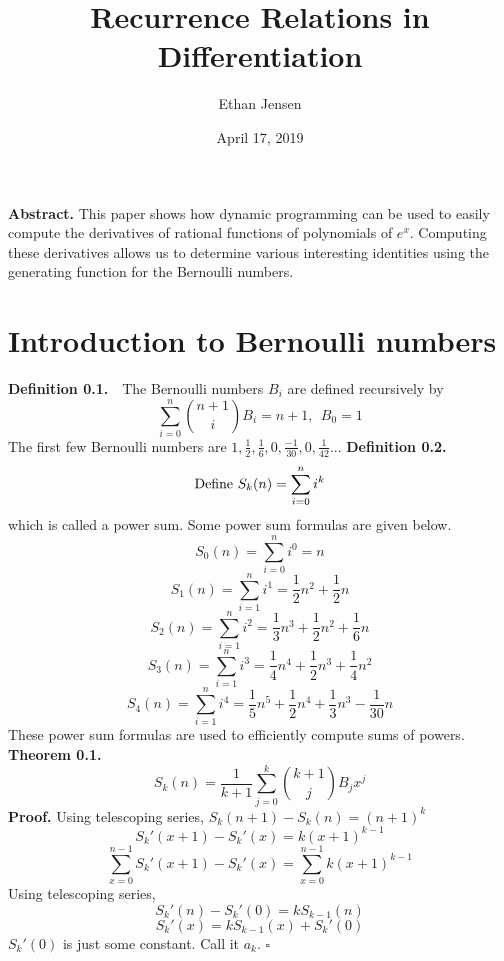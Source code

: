 \documentclass[12pt]{article}
\title{Recurrence Relations in Differentiation}
\author{Ethan Jensen}
\date{April 17, 2019}
\begin{document}
\maketitle
{}

\noindent
\textbf{Abstract.} This paper shows how dynamic programming can be used to easily compute the derivatives of rational functions of polynomials of \(e^x\). Computing these derivatives allows us to determine various interesting identities using the generating function for the Bernoulli numbers.
\section{Introduction to Bernoulli numbers}
\textbf{Definition 0.1.}\ \
The Bernoulli numbers \(B_i\) are defined recursively by
\[\sum_{i=0}^n\binom{n+1}{i}B_i=n+1,\ \ B_0 = 1\]
The first few Bernoulli numbers are \(1, \frac{1}{2}, \frac{1}{6}, 0, \frac{-1}{30}, 0, \frac{1}{42}...\)
\newline
\textbf{Definition 0.2.}
\[\textup{Define } S_k(n) = \sum_{i=0}^ni^k\]
which is called a power sum. Some power sum formulas are given below.
\[S_0(n) = \sum_{i=0}^ni^0 = n\]
\[S_1(n) = \sum_{i=1}^ni^1 = \frac{1}{2}n^2 + \frac{1}{2}n\]
\[S_2(n) = \sum_{i=1}^ni^2 = \frac{1}{3}n^3 + \frac{1}{2}n^2 + \frac{1}{6}n\]
\[S_3(n) = \sum_{i=1}^ni^3 = \frac{1}{4}n^4 + \frac{1}{2}n^3 + \frac{1}{4}n^2\]
\[S_4(n) = \sum_{i=1}^ni^4 = \frac{1}{5}n^5 + \frac{1}{2}n^4 + \frac{1}{3}n^3 -\frac{1}{30}n\]
These power sum formulas are used to efficiently compute sums of powers.
\newpage
\noindent
\textbf{Theorem 0.1.}
\newline
\[S_k(n) = \frac{1}{k+1}\sum_{j=0}^k\binom{k+1}{j}B_jx^j\]
\textbf{Proof.}\cite{arakawa2014bernoulli}
\newline
Using telescoping series, \(S_k(n+1) - S_k(n) = (n+1)^k\)
\[S_k'(x+1) - S_k'(x) = k(x+1)^{k-1}\]
\[\sum_{x=0}^{n-1}S_k'(x+1) - S_k'(x) = \sum_{x=0}^{n-1}k(x+1)^{k-1}\]
Using telescoping series,
\[S_k'(n) - S_k'(0) = kS_{k-1}(n)\]
\[S_k'(x) = kS_{k-1}(x) + S_k'(0)\]
\(S_k'(0)\) is just some constant. Call it \(a_k\).
\newline
{}
\newline \(\square\) \newline
\end{document}
